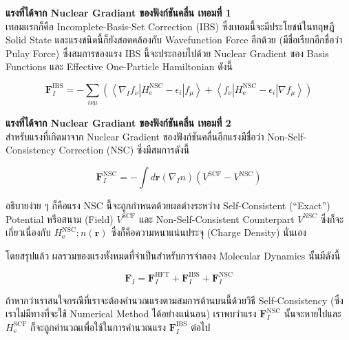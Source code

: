 \noindent \textbf{แรงที่ได้จาก Nuclear Gradiant ของฟังก์ชันคลื่น เทอมที่ 1} \\
เทอมแรกก็คือ Incomplete-Basis-Set Correction (IBS) ซึ่งเทอมนี้จะมีประโยชน์ในทฤษฎี Solid State และแรงชนิดนี้ก็ยังสอดคล้องกับ
Wavefunction Force อีกด้วย (มีชื่อเรียกอีกชื่อว่า Pulay Force) ซึ่งสมการของแรง IBS นี้จะประกอบไปด้วย Nuclear Gradient ของ
Basis Functions และ Effective One-Particle Hamiltonian ดังนี้

\begin{equation}
  \mathbf{F}_I^{\mathrm{IBS}}
  =
  - \sum_{i \nu \mu}\left(\left\langle\nabla_I f_\nu\left| H_{\mathrm{e}}^{\mathrm{NSC}}-\epsilon_i\right| f_\mu\right\rangle
  + \left\langle f_\nu\left| H_{\mathrm{e}}^{\mathrm{NSC}}-\epsilon_i\right| \nabla f_\mu\right\rangle\right)
\end{equation}

\noindent \textbf{แรงที่ได้จาก Nuclear Gradiant ของฟังก์ชันคลื่น เทอมที่ 2} \\
สำหรับแรงที่เกิดมาจาก Nuclear Gradient ของฟังก์ชันคลื่นอีกแรงมีชื่อว่า Non-Self-Consistency Correction (NSC) ซึ่งมีสมการดังนี้

\begin{equation}
  \mathbf{F}_I^{\mathrm{NSC}}
  =
  - \int d \mathbf{r}\left(\nabla_I n\right)\left(V^{\mathrm{SCF}}-V^{\mathrm{NSC}}\right)
\end{equation}

\noindent อธิบายง่าย ๆ ก็คือแรง NSC นี้จะถูกกำหนดด้วยผลต่างระหว่าง Self-Consistent (\enquote{Exact}) Potential หรือสนาม
(Field) $V^{\mathrm{SCF}}$ และ Non-Self-Consistent Counterpart $V^{\mathrm{NSC}}$ ซึ่งก็จะเกี่ยวเนื่องกับ
$H_{\mathrm{e}}^{\mathrm{NSC}} ; n(\mathbf{r})$ ซึ่งก็คือความหนาแน่นประจุ (Charge Density) นั่นเอง

โดยสรุปแล้ว ผลรวมของแรงทั้งหมดที่จำเป็นสำหรับการจำลอง  Molecular Dynamics นั้นมีดังนี้

\begin{equation}
  \mathbf{F}_I
  =
  \mathbf{F}_I^{\mathrm{HFT}}
  + \mathbf{F}_I^{\mathrm{IBS}}
  + \mathbf{F}_I^{\mathrm{NSC}}
\end{equation}

\noindent ถ้าหากว่าเราสนใจกรณีที่เราจะต้องคำนวณแรงตามสมการด้านบนนี้ด้วยวิธี Self-Consistency (ซึ่งเราไม่มีทางที่จะใช้ Numerical
Method ได้อย่างแน่นอน) เราพบว่าแรง $\mathbf{F}_I^{\mathrm{NSC}}$ นั้นจะหายไปและ $ H_{\mathrm{e}}^{\mathrm{SCF}}$ 
ก็จะถูกคำนวณเพื่อใช้ในการคำนวณแรง $\mathbf{F}_I^{\mathrm{IBS}}$ ต่อไป 

